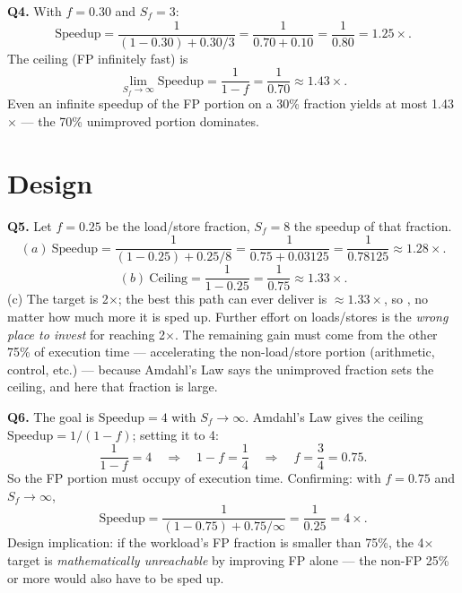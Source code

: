 \documentclass[11pt]{article}
\begin{document}
\textbf{Q4.} With $f = 0.30$ and $S_f = 3$:
\[
\text{Speedup} = \frac{1}{(1 - 0.30) + 0.30/3} = \frac{1}{0.70 + 0.10} = \frac{1}{0.80} = 1.25\times.
\]
The ceiling (FP infinitely fast) is
\[
\lim_{S_f \to \infty} \text{Speedup} = \frac{1}{1 - f} = \frac{1}{0.70} \approx 1.43\times.
\]
Even an infinite speedup of the FP portion on a 30\% fraction yields at most 1.43$\times$ --- the 70\% unimproved portion dominates.

\section{Design}

\textbf{Q5.} Let $f = 0.25$ be the load/store fraction, $S_f = 8$ the speedup of that fraction.
\[
(a)\ \text{Speedup} = \frac{1}{(1 - 0.25) + 0.25/8} = \frac{1}{0.75 + 0.03125} = \frac{1}{0.78125} \approx 1.28\times.
\]
\[
(b)\ \text{Ceiling} = \frac{1}{1 - 0.25} = \frac{1}{0.75} \approx 1.33\times.
\]
(c) The target is 2$\times$; the best this path can ever deliver is $\approx 1.33\times$, so , no matter how much more it is sped up. Further effort on loads/stores is the \emph{wrong place to invest} for reaching 2$\times$. The remaining gain must come from the other 75\% of execution time --- accelerating the non-load/store portion (arithmetic, control, etc.) --- because Amdahl's Law says the unimproved fraction sets the ceiling, and here that fraction is large.

\textbf{Q6.} The goal is $\text{Speedup} = 4$ with $S_f \to \infty$. Amdahl's Law gives the ceiling $\text{Speedup} = 1/(1-f)$; setting it to 4:
\[
\frac{1}{1 - f} = 4 \quad\Longrightarrow\quad 1 - f = \frac{1}{4} \quad\Longrightarrow\quad f = \frac{3}{4} = 0.75.
\]
So the FP portion must occupy  of execution time. Confirming: with $f = 0.75$ and $S_f \to \infty$,
\[
\text{Speedup} = \frac{1}{(1 - 0.75) + 0.75/\infty} = \frac{1}{0.25} = 4\times.
\]
Design implication: if the workload's FP fraction is smaller than 75\%, the 4$\times$ target is \emph{mathematically unreachable} by improving FP alone --- the non-FP 25\% or more would also have to be sped up.
\end{document}
